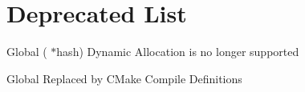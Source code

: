 \chapter{Deprecated List}
\hypertarget{deprecated}{}\label{deprecated}

\begin{DoxyRefList}
\item[Global \doxylink{hash__table_8h_ac8f1faa6debf15cdd31b24336055ad07}{Hash\+\_\+\+Delete\+Hash\+Table} (\doxylink{struct_hash_table}{Hash\+Table} \texorpdfstring{$\ast$}{*}hash)]\label{deprecated__deprecated000002}%
%
Dynamic Allocation is no longer supported  
\item[Global \doxylink{global__constants_8h_a2098ddebdb26af02b8f4bcf35a665815}{x86\+\_\+\+GCC} ]\label{deprecated__deprecated000001}%
%
Replaced by CMake Compile Definitions 
\end{DoxyRefList}